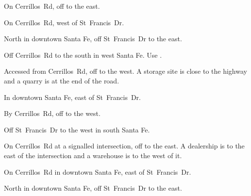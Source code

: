 
\begin{LocationList}

On Cerrillos~Rd, off  to the east.

\Location{\GarageHQ \Garage}
On Cerrillos~Rd, west of  St~Francis~Dr.

\Location{\GasStation \Gas}
North in downtown Santa Fe, off  St~Francis~Dr to the east.

Off Cerrillos~Rd to the south in west Santa Fe.
Use .

Accessed from Cerrillos~Rd, off  to the west.
A storage site is close to the highway and a quarry is at the end of the road.

\Location{\RecruitmentAgency \Recruitment}
In downtown Santa Fe, east of  St~Francis~Dr.

By Cerrillos~Rd, off  to the west.

\Location{\TruckService \Service}
Off  St~Francis~Dr to the west in south Santa Fe.

On Cerrillos~Rd at a signalled intersection, off  to the east.
A dealership is to the east of the intersection and a warehouse is to the west of it.

On Cerrillos~Rd in downtown Santa Fe, east of  St~Francis~Dr.

North in downtown Santa Fe, off  St~Francis~Dr to the east.

\end{LocationList}

